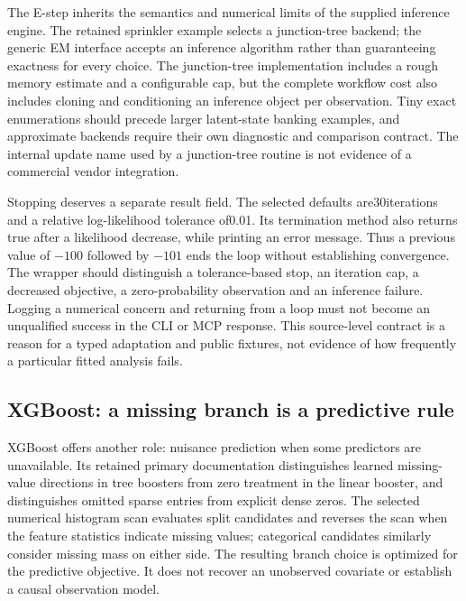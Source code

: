 The E-step inherits the semantics and numerical limits of the supplied inference engine. The retained sprinkler example selects a junction-tree backend; the generic EM interface accepts an inference algorithm rather than guaranteeing exactness for every choice. The junction-tree implementation includes a rough memory estimate and a configurable cap, but the complete workflow cost also includes cloning and conditioning an inference object per observation. Tiny exact enumerations should precede larger latent-state banking examples, and approximate backends require their own diagnostic and comparison contract. The internal update name used by a junction-tree routine is not evidence of a commercial vendor integration.\citep{exec25_ctm_libdai}

Stopping deserves a separate result field. The selected defaults are30iterations and a relative log-likelihood tolerance of0.01. Its termination method also returns true after a likelihood decrease, while printing an error message. Thus a previous value of $-100$ followed by $-101$ ends the loop without establishing convergence. The wrapper should distinguish a tolerance-based stop, an iteration cap, a decreased objective, a zero-probability observation and an inference failure. Logging a numerical concern and returning from a loop must not become an unqualified success in the CLI or MCP response. This source-level contract is a reason for a typed adaptation and public fixtures, not evidence of how frequently a particular fitted analysis fails.\citep{exec25_ctm_libdai,exec25_ctm_choice}

\subsection*{XGBoost: a missing branch is a predictive rule}
XGBoost offers another role: nuisance prediction when some predictors are unavailable. Its retained primary documentation distinguishes learned missing-value directions in tree boosters from zero treatment in the linear booster, and distinguishes omitted sparse entries from explicit dense zeros. The selected numerical histogram scan evaluates split candidates and reverses the scan when the feature statistics indicate missing values; categorical candidates similarly consider missing mass on either side. The resulting branch choice is optimized for the predictive objective. It does not recover an unobserved covariate or establish a causal observation model.\citep{exec25_ctm_xgboost}

